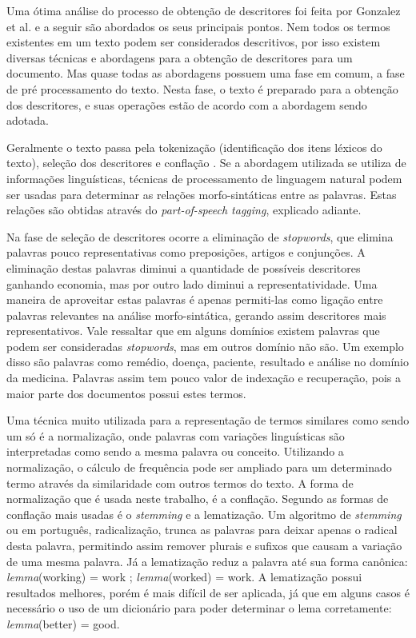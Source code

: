 Uma ótima análise do processo de obtenção de descritores foi feita por Gonzalez et al. \cite{Gonzalez2006} e a seguir são abordados os seus principais pontos. Nem todos os termos existentes em um texto podem ser considerados descritivos, por isso existem diversas técnicas e abordagens para a obtenção de descritores para um documento. Mas quase todas as abordagens possuem uma fase em comum, a fase de pré processamento do texto. Nesta fase, o texto é preparado para a obtenção dos descritores, e suas operações estão de acordo com a abordagem sendo adotada.

 Geralmente o texto passa pela tokenização (identificação dos itens léxicos do texto), seleção dos descritores e conflação \cite{Yates1999}. Se a abordagem utilizada se utiliza de informações linguísticas, técnicas de processamento de linguagem natural podem ser usadas para determinar as relações morfo-sintáticas entre as palavras. Estas relações são obtidas através do \emph{part-of-speech tagging}, explicado adiante.

Na fase de seleção de descritores ocorre a eliminação de \emph{stopwords}, que elimina palavras pouco representativas como preposições, artigos e conjunções. A eliminação destas palavras diminui a quantidade de possíveis descritores ganhando economia, mas por outro lado diminui a representatividade. Uma maneira de aproveitar estas palavras é apenas permiti-las como ligação entre palavras relevantes na análise morfo-sintática, gerando assim descritores mais representativos. Vale ressaltar que em alguns domínios existem palavras que podem ser consideradas \emph{stopwords}, mas em outros domínio não são. Um exemplo disso são palavras como remédio, doença, paciente, resultado e análise no domínio da medicina. Palavras assim tem pouco valor de indexação e recuperação, pois a maior parte dos documentos possui estes termos.

Uma técnica muito utilizada para a representação de termos similares como sendo um só é a normalização, onde palavras com variações linguísticas são interpretadas como sendo a mesma palavra ou conceito. Utilizando a normalização, o cálculo de frequência pode ser ampliado para um determinado termo através da similaridade com outros termos do texto. A forma de normalização que é usada neste trabalho, é a conflação. Segundo \cite{Gonzalez2006} as formas de conflação mais usadas é o \emph{stemming} e a lematização. Um algoritmo de \emph{stemming} ou em português, radicalização, trunca as palavras para deixar apenas o radical desta palavra, permitindo assim remover plurais e sufixos que causam a variação de uma mesma palavra. Já a lematização reduz a palavra até sua forma canônica: \emph{lemma}(working) = work ; \emph{lemma}(worked) = work. A lematização possui resultados melhores, porém é mais difícil de ser aplicada, já que em alguns casos é necessário o uso de um dicionário para poder determinar o lema corretamente: \emph{lemma}(better) = good.

